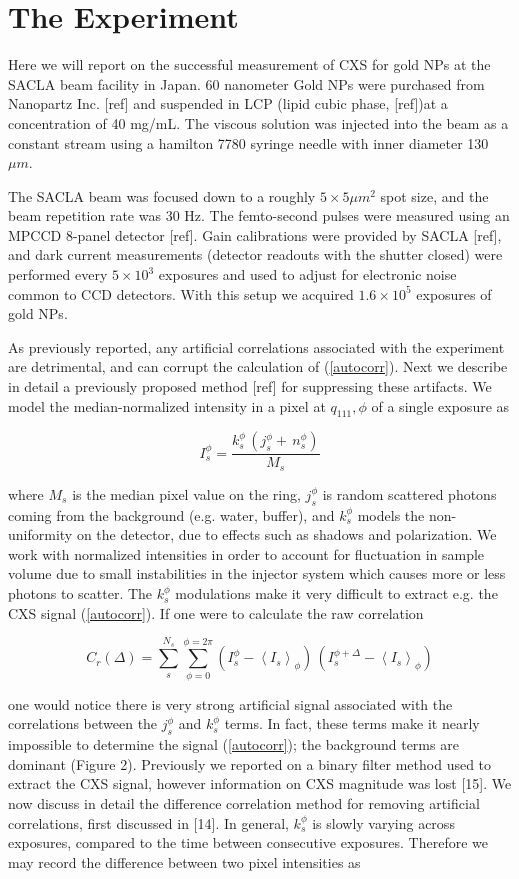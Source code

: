 \documentclass [11pt,fleqn]{article}
\def \be {\begin{equation}}
\def \ee {\end{equation}}
\begin{document}
\section{The Experiment}
Here we will report on the successful measurement of CXS for gold NPs at the SACLA beam facility in Japan. 60 nanometer Gold NPs were purchased from Nanopartz Inc. [ref] and suspended in LCP (lipid cubic phase, [ref])at a concentration of 40 mg/mL. The viscous solution was injected into the beam as a constant stream using a  hamilton 7780 syringe needle with inner diameter 130 $\mu m$.

The SACLA beam was focused down to a roughly $5 \times 5 \mu m ^2$ spot size, and the beam repetition rate was 30 Hz. The femto-second pulses were measured using an MPCCD 8-panel detector [ref]. Gain calibrations were provided by SACLA [ref], and dark current measurements (detector readouts with the shutter closed) were performed every $5\times 10^3$ exposures and used to adjust for electronic noise common to CCD detectors. With this setup we acquired $1.6\times 10^5$ exposures of gold NPs. 



As previously reported, any artificial correlations associated with the experiment are detrimental, and can corrupt the calculation of (\ref {autocorr}). Next we describe in detail a previously proposed method [ref] for suppressing these artifacts. We model the median-normalized intensity in a pixel at $q_{111}, \phi$ of a single exposure as

\be
I_s^ \phi  = \frac{ k_s^\phi \,\left( j_s^\phi  + \,n_s^\phi  \right ) }{ M_s} 
\ee

where $M_s$ is the median pixel value on the ring,  $j_s^\phi$ is random scattered photons coming from the background (e.g. water, buffer), and $k_s^\phi$ models the non-uniformity on the detector, due to effects such as shadows and polarization. We work with normalized intensities in order to account for fluctuation in sample volume due to small instabilities in the injector system which causes more or less photons to scatter. The $k_s^\phi$ modulations make it very difficult to extract e.g. the CXS signal (\ref{autocorr}). If one were to calculate the raw correlation

\be \label{rawCorr}
C_{r}(\Delta) = \sum_s^{N_s} \sum_{\phi=0}^{\phi=2\pi} \left( I_s^\phi  - \left \langle {I_s} \right \rangle _\phi \right)\,\left(I_s^{\phi+\Delta}  - \left\langle {I_s}\right\rangle _\phi \right)
\ee

one would notice there is very strong artificial signal associated with the correlations between the $j_s^\phi$ and $k_s^\phi$ terms. In fact, these terms make it nearly impossible to determine the signal (\ref{autocorr}); the background terms are dominant (Figure 2). Previously we reported on a binary filter method used to extract the CXS signal, however information on CXS magnitude was lost [15]. We now discuss in detail the difference correlation method for removing artificial correlations, first discussed in [14]. In general, $k_s^\phi$ is slowly varying across exposures, compared to the time between consecutive exposures. Therefore we may record the difference between two pixel intensities as
\end{document}
